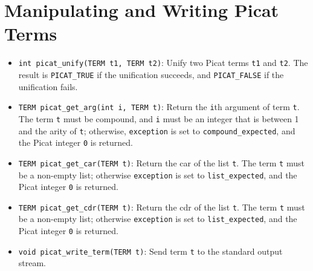 \section{Manipulating and Writing Picat Terms} 
\begin{itemize}
\item \texttt{int picat\_unify(TERM t1, TERM t2)}: Unify two Picat terms \texttt{t1} and \texttt{t2}. The result is \texttt{PICAT\_TRUE} if the unification succeeds, and \texttt{PICAT\_FALSE} if the unification fails.

\item \texttt{TERM picat\_get\_arg(int i, TERM t)}: Return the \texttt{i}th argument of term \texttt{t}. The term \texttt{t} must be compound, and \texttt{i} must be an integer that is between 1 and the arity of \texttt{t}; otherwise, \texttt{exception} is set to \texttt{compound\_expected}, and the Picat integer \texttt{0} is returned.

\item \texttt{TERM picat\_get\_car(TERM t)}: Return the car of the list \texttt{t}. The term \texttt{t} must be a non-empty list; otherwise \texttt{exception} is set to \texttt{list\_expected}, and the Picat integer \texttt{0} is returned.

\item \texttt{TERM picat\_get\_cdr(TERM t)}: Return the cdr of the list \texttt{t}. The term \texttt{t} must be a non-empty list; otherwise \texttt{exception} is set to \texttt{list\_expected}, and the Picat integer \texttt{0} is returned.

\item \texttt{void picat\_write\_term(TERM t)}: Send term \texttt{t} to the standard output stream.
\end{itemize}

